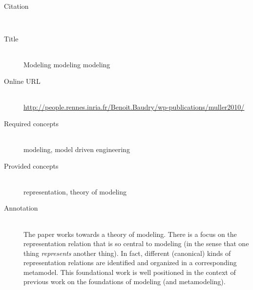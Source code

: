 \begin{description}
\item[Citation]\mbox{}\\
\cite{MullerFBC12}
\item[Title]\mbox{}\\
Modeling modeling modeling
\item[Online URL]\mbox{}\\
{\footnotesize\url{http://people.rennes.inria.fr/Benoit.Baudry/wp-publications/muller2010/}}
\item[Required concepts]\mbox{}\\
modeling, model driven engineering\item[Provided concepts]\mbox{}\\
representation, theory of modeling\item[Annotation]\mbox{}\\
The paper works towards a theory of modeling. There is a focus on the representation relation that is so central to modeling (in the sense that one thing \emph{represents} another thing). In fact, different (canonical) kinds of representation relations are identified and organized in a corresponding metamodel. This foundational work is well positioned in the context of previous work on the foundations of modeling (and metamodeling).
\end{description}

